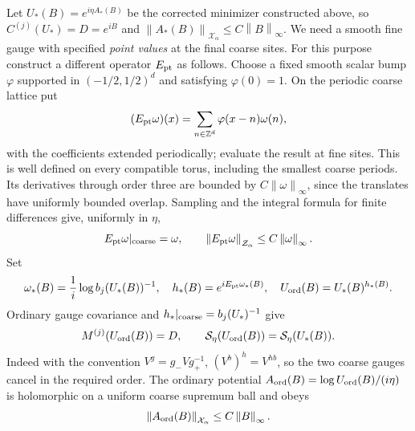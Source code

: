 \documentclass[11pt]{article}
\theoremstyle{remark}
\newcommand{\norm}[1]{\left\|#1\right\|}
\begin{document}
Let $U_*(B)=e^{i\eta A_*(B)}$ be the corrected minimizer
constructed above, so $C^{(j)}(U_*)=D=e^{iB}$ and
$\norm{A_*(B)}_{\mathcal X_\alpha}\le C\norm{B}_\infty$.
We need a smooth fine gauge with specified \emph{point values}
at the final coarse sites. For this purpose construct a
different operator $E_{\rm pt}$ as follows. Choose a fixed
smooth scalar bump $\varphi$ supported in
$(-1/2,1/2)^d$ and satisfying $\varphi(0)=1$. On the
periodic coarse lattice put
\begin{equation}\label{ot-point-extension}
 (E_{\rm pt}\omega)(x)=\sum_{n\in\mathbb Z^d}
                  \varphi(x-n)\omega(n),
\end{equation}
with the coefficients extended periodically; evaluate the
result at fine sites. This is well defined on every
compatible torus, including the smallest coarse periods.
Its derivatives through order three are bounded by
$C\norm{\omega}_\infty$, since the translates have uniformly
bounded overlap. Sampling and the integral formula for
finite differences give, uniformly in $\eta$,
\begin{equation}\label{ot-point-bounds}
 E_{\rm pt}\omega|_{\rm coarse}=\omega,\qquad
 \norm{E_{\rm pt}\omega}_{\mathcal Z_\alpha}
                          \le C\norm{\omega}_\infty.
\end{equation}
Set
\begin{equation}\label{ot-ordinary-representative}
 \omega_*(B)=\frac1i\log b_j(U_*(B))^{-1},\quad
 h_*(B)=e^{iE_{\rm pt}\omega_*(B)},\quad
 U_{\rm ord}(B)=U_*(B)^{h_*(B)}.
\end{equation}
Ordinary gauge covariance and $h_*|_{\rm coarse}=b_j(U_*)^{-1}$
give
\begin{equation}\label{ot-ordinary-exact}
 M^{(j)}(U_{\rm ord}(B))=D,\qquad
 \mathcal S_\eta(U_{\rm ord}(B))=\mathcal S_\eta(U_*(B)).
\end{equation}
Indeed with the convention $V^g=g_-Vg_+^{-1}$,
$(V^b)^h=V^{hb}$, so the two coarse gauges cancel in the
required order. The ordinary potential
$A_{\rm ord}(B)=\log U_{\rm ord}(B)/(i\eta)$ is holomorphic
on a uniform coarse supremum ball and obeys
\begin{equation}\label{ot-ordinary-bound}
 \norm{A_{\rm ord}(B)}_{\mathcal X_\alpha}
                              \le C\norm{B}_\infty.
\end{equation}
\end{document}
